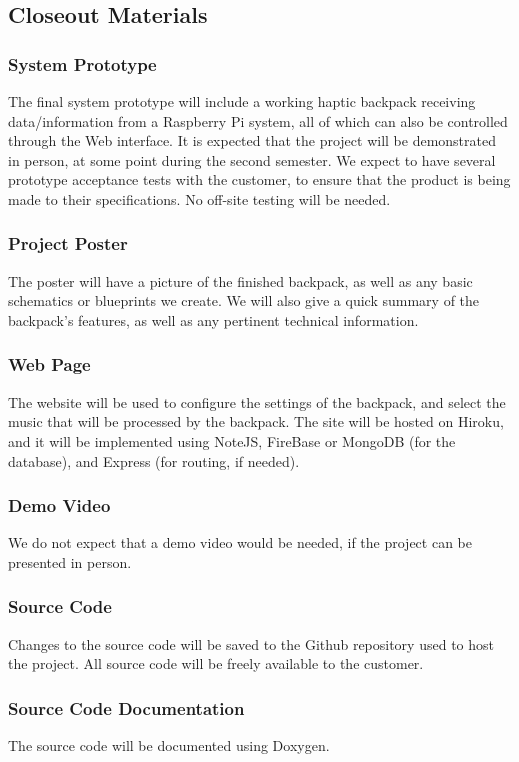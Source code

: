 \subsection{Closeout Materials}

\subsubsection{System Prototype}
The final system prototype will include a working haptic backpack receiving data/information from a Raspberry Pi system, all of which can also be controlled through the Web interface. It is expected that the project will be demonstrated in person, at some point during the second semester. We expect to have several prototype acceptance tests with the customer, to ensure that the product is being made to their specifications. No off-site testing will be needed.

\subsubsection{Project Poster}
The poster will have a picture of the finished backpack, as well as any basic schematics or blueprints we create. We will also give a quick summary of the backpack's features, as well as any pertinent technical information.

\subsubsection{Web Page}
The website will be used to configure the settings of the backpack, and select the music that will be processed by the backpack. The site will be hosted on Hiroku, and it will be implemented using NoteJS, FireBase or MongoDB (for the database), and Express (for routing, if needed).

\subsubsection{Demo Video}
We do not expect that a demo video would be needed, if the project can be presented in person.

\subsubsection{Source Code}
Changes to the source code will be saved to the Github repository used to host the project. All source code will be freely available to the customer.

\subsubsection{Source Code Documentation}
The source code will be documented using Doxygen.

